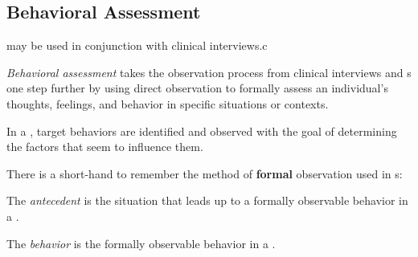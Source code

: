 \subsection{Behavioral Assessment}\label{subsec:Behavioral_Assessment}
 may be used in conjunction with clinical interviews.c

\begin{definition}\label{def:Behavioral_Assessment}
  \emph{Behavioral assessment} takes the observation process from clinical interviews and s one step further by using direct observation to formally assess an individual's thoughts, feelings, and behavior in specific situations or contexts.
\end{definition}

In a , target behaviors are identified and observed with the goal of determining the factors that seem to influence them.

There is a short-hand to remember the method of \textbf{formal} observation used in s:
\begin{description}[noitemsep]
\item[A] 
\item[B] 
\item[C] 
\end{description}

\begin{definition}[Antecedent]\label{def:Antecedent}
  The \emph{antecedent} is the situation that leads up to a formally observable behavior in a .
\end{definition}

\begin{definition}[Behavior]\label{def:Behavior}
  The \emph{behavior} is the formally observable behavior in a .
\end{definition}


